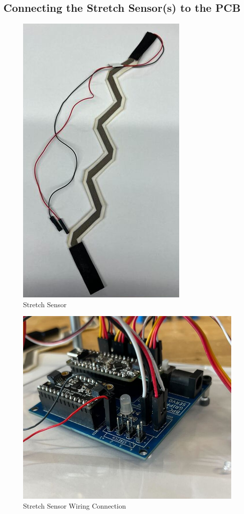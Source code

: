 \documentclass{article}
\begin{document}
\subsection{Connecting the Stretch Sensor(s) to the PCB}

\begin{figure}[H]
    \centering
    \includegraphics[width=0.5\linewidth]{PCBImages/StretchSensor/stretch_sensor_1.png}
    \caption{Stretch Sensor}
    \label{fig:enter-label}
\end{figure}

\begin{figure}[H]
    \centering
    \includegraphics[width=0.5\linewidth]{PCBImages/StretchSensor/stretch_sensor_2.jpg}
    \caption{Stretch Sensor Wiring Connection}
    \label{fig:enter-label}
\end{figure}
\end{document}
